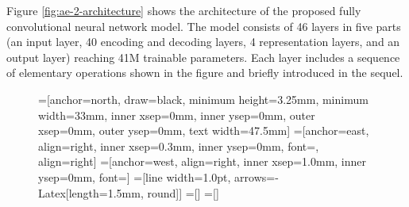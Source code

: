 \documentclass[twocolumn,letter,10pt]{IEEEtran} %
\begin{document}
Figure \ref{fig:ae-2-architecture} shows the architecture of the proposed fully convolutional neural network model. The model consists of 46 layers in five parts (an input layer, 40 encoding and decoding layers, 4 representation layers, and an output layer) reaching 41M trainable parameters. Each layer includes a sequence of elementary operations shown in the figure and briefly introduced in the sequel.

\begin{figure}[!htbp]
	\pgfmathsetlengthmacro\LblR{5mm}
	\pgfmathsetlengthmacro\LblL{6mm}
	\pgfmathsetlengthmacro\AllLayerWidth{1.75mm}
	\pgfmathsetlengthmacro\InnerLayerSep{3.9mm}
	\pgfmathsetlengthmacro\InnerLayerSepMerge{0.6mm}
	\pgfmathsetlengthmacro\SkpXShift{2mm}



	\def\vsvsin{-2.75mm}
	\def\vshdin{-0.90mm}
	\def\vshdot{-1.99mm}
	\def\vsvsot{-2.75mm}

	\def\CONVHeight{3.25mm}
	\def\CONVWidth{33mm}

	=[anchor=north, draw=black, minimum height=\CONVHeight, minimum width=\CONVWidth,
	inner xsep=0mm, inner ysep=0mm, outer xsep=0mm, outer ysep=0mm, text width=47.5mm]
	=[anchor=east, align=right, inner xsep=0.3mm, inner ysep=0mm, font={\tiny}, align=right]
	=[anchor=west, align=right, inner xsep=1.0mm, inner ysep=0mm, font={\scriptsize}]
	=[line width=1.0pt, arrows={-{Latex[length=1.5mm, round]}}]
	=[]
	=[]


	\centering
	\scriptsize
	\begin{tikzpicture}



\end{tikzpicture}
\end{figure}
\end{document}
